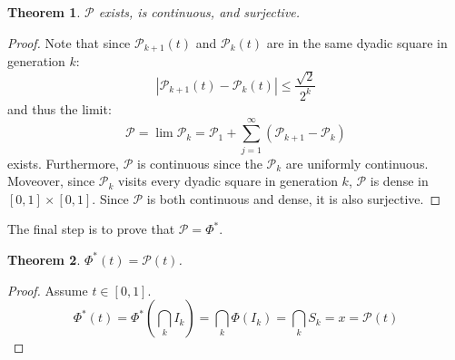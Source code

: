 \documentclass[letterpaper,12pt,fleqn,reqno]{amsart}
\newcommand{\uint}{[0,1]}
\newcommand{\usq}{\uint\times\uint}
\newcommand{\pc}{\mathcal{P}}
\newcommand{\abs}[1]{\left\lvert#1\right\rvert}
\theoremstyle{plain}
\newtheorem{thm}{Theorem}[section]
\begin{document}
\begin{thm}
$\pc$ exists, is continuous, and surjective.
\end{thm}

\begin{proof}
Note that since $\pc_{k+1}(t)$ and $\pc_k(t)$ are in the same dyadic square
in generation $k$:
\[\abs{\pc_{k+1}(t)-\pc_k(t)}\le\frac{\sqrt{2}}{2^k}\]
and thus the limit:
\[\pc=\lim{\pc_k}=\pc_1+\sum_{j=1}^{\infty}\left(\pc_{k+1}-\pc_k\right)\]
exists. Furthermore, $\pc$ is continuous since the $\pc_k$ are uniformly
continuous. Moveover, since $\pc_k$ visits every dyadic square in generation
$k$, $\pc$ is dense in $\usq$.  Since $\pc$ is both continuous and dense, it is
also surjective.
\end{proof}

The final step is to prove that $\pc=\Phi^*$.

\begin{thm}
$\Phi^*(t)=\pc(t)$.
\end{thm}

\begin{proof}
Assume $t\in\uint$.
\[\Phi^*(t)=\Phi^*\left(\bigcap_kI_k\right)=\bigcap_k\Phi(I_k)=
    \bigcap_kS_k=x=\pc(t)\]
\end{proof}

\nocite{*}
 
    
\end{document}
